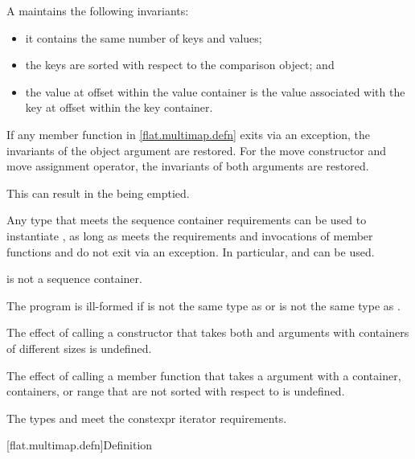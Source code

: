 \pnum
A  maintains the following invariants:
\begin{itemize}
\item
it contains the same number of keys and values;
\item
the keys are sorted with respect to the comparison object; and
\item
the value at offset  within the value container is the value
associated with the key at offset  within the key container.
\end{itemize}

\pnum
If any member function in \ref{flat.multimap.defn} exits via an exception,
the invariants of the object argument are restored.
For the move constructor and move assignment operator,
the invariants of both arguments are restored.
\begin{note}
This can result in the  being emptied.
\end{note}

\pnum
Any type 
that meets the sequence container requirements
can be used to instantiate ,
as long as
 meets the  requirements and
invocations of
member functions  and  do not exit via an exception.
In particular,
 and  can be used.
\begin{note}
 is not a sequence container.
\end{note}

\pnum
The program is ill-formed if
 is not the same type as  or
 is not the same type as .

\pnum
The effect of calling a constructor
that takes both  and
 arguments
with containers of different sizes is undefined.

\pnum
The effect of calling a member function
that takes a  argument
with a container, containers, or range
that are not sorted with respect to  is undefined.

\pnum
The types  and  meet
the constexpr iterator requirements.

[flat.multimap.defn]{Definition}


